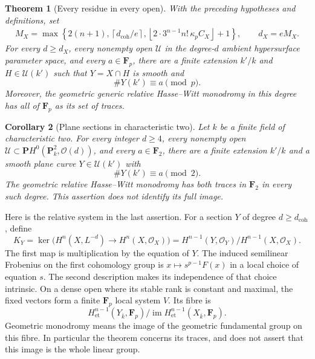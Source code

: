 \documentclass[11pt]{article}
\newtheorem{theorem}{Theorem}[section]
\newtheorem{corollary}[theorem]{Corollary}
\theoremstyle{remark}\newtheorem{remark}[theorem]{Remark}
\newcommand{\OO}{\mathcal O}
\newcommand{\FF}{\mathbf F}
\newcommand{\PP}{\mathbf P}
\newcommand{\et}{\mathrm{et}}
\newcommand{\im}{\operatorname{im}}
\begin{document}
\begin{theorem}[Every residue in every open]\label{thm:residues}
With the preceding hypotheses and definitions, set
\begin{equation}\label{eq:degree-bound}
 \begin{split}
 M_X=\max\left\{2(n+1),\left\lceil d_{\mathrm{coh}}/e\right\rceil,
       \left\lfloor2\cdot3^{n-1}n!\,\kappa_pC_X\right\rfloor+1\right\},
 \qquad d_X=eM_X.
 \end{split}
\end{equation}
For every $d\ge d_X$, every nonempty open $\mathcal U$ in the degree-$d$ ambient hypersurface parameter space, and every $a\in\FF_p$, there are a finite extension $k'/k$ and $H\in\mathcal U(k')$ such that $Y=X\cap H$ is smooth and
\[
                              \#Y(k')\equiv a\pmod p.
\]
Moreover, the geometric generic relative Hasse--Witt monodromy in this degree has all of $\FF_p$ as its set of traces.
\end{theorem}

\begin{corollary}[Plane sections in characteristic two]\label{cor:plane-two}
Let $k$ be a finite field of characteristic two. For every integer $d\ge4$, every nonempty open $\mathcal U\subset\PP H^0(\PP^2_k,\OO(d))$, and every $a\in\FF_2$, there are a finite extension $k'/k$ and a smooth plane curve $Y\in\mathcal U(k')$ with
\[
                              \#Y(k')\equiv a\pmod2.
\]
The geometric relative Hasse--Witt monodromy has both traces in $\FF_2$ in every such degree. This assertion does not identify its full image.
\end{corollary}

Here is the relative system in the last assertion. For a section $Y$ of degree $d\ge d_{\mathrm{coh}}$, define
\begin{equation}\label{eq:relative}
 K_Y=\ker\bigl(H^n(X,L^{-d})\longrightarrow H^n(X,\OO_X)\bigr)
     =H^{n-1}(Y,\OO_Y)/H^{n-1}(X,\OO_X).
\end{equation}
The first map is multiplication by the equation of $Y$. The induced semilinear Frobenius on the first cohomology group is $x\mapsto s^{p-1}F(x)$ in a local choice of equation $s$. The second description makes its independence of that choice intrinsic. On a dense open where its stable rank is constant and maximal, the fixed vectors form a finite $\FF_p$ local system $V$. Its fibre is
\[
 H^{n-1}_{\et}(Y_{\bar k},\FF_p)\big/
                \im H^{n-1}_{\et}(X_{\bar k},\FF_p).
\]
Geometric monodromy means the image of the geometric fundamental group on this fibre. In particular the theorem concerns its traces, and does not assert that this image is the whole linear group.
\end{document}
